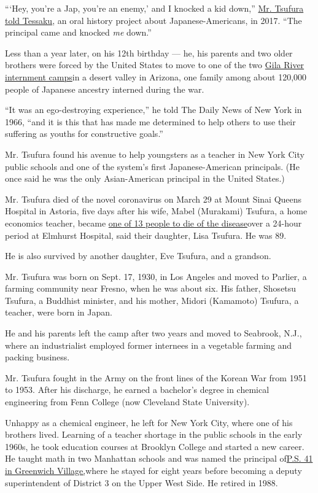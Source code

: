 ```Hey, you're a Jap, you're an enemy,' and I knocked a kid down,''
\href{https://www.tessaku.com/oral-histories//2017/03/15/tadashi-tsufura}{Mr.
Tsufura told Tessaku}, an oral history project about Japanese-Americans,
in 2017. ``The principal came and knocked \emph{me} down.''

Less than a year later, on his 12th birthday --- he, his parents and two
older brothers were forced by the United States to move to one of the
two \href{https://encyclopedia.densho.org/Gila_River/}{Gila River
internment camps}in a desert valley in Arizona, one family among about
120,000 people of Japanese ancestry interned during the war.

``It was an ego-destroying experience,'' he told The Daily News of New
York in 1966, ``and it is this that has made me determined to help
others to use their suffering as youths for constructive goals.''

Mr. Tsufura found his avenue to help youngsters as a teacher in New York
City public schools and one of the system's first Japanese-American
principals. (He once said he was the only Asian-American principal in
the United States.)

Mr. Tsufura died of the novel coronavirus on March 29 at Mount Sinai
Queens Hospital in Astoria, five days after his wife, Mabel (Murakami)
Tsufura, a home economics teacher, became
\href{https://www.nytimes3xbfgragh.onion/2020/03/25/nyregion/nyc-coronavirus-hospitals.html}{one
of 13 people to die of the disease}over a 24-hour period at Elmhurst
Hospital, said their daughter, Lisa Tsufura. He was 89.

He is also survived by another daughter, Eve Tsufura, and a grandson.

Mr. Tsufura was born on Sept. 17, 1930, in Los Angeles and moved to
Parlier, a farming community near Fresno, when he was about six. His
father, Shosetsu Tsufura, a Buddhist minister, and his mother, Midori
(Kamamoto) Tsufura, a teacher, were born in Japan.

He and his parents left the camp after two years and moved to Seabrook,
N.J., where an industrialist employed former internees in a vegetable
farming and packing business.

Mr. Tsufura fought in the Army on the front lines of the Korean War from
1951 to 1953. After his discharge, he earned a bachelor's degree in
chemical engineering from Fenn College (now Cleveland State University).

Unhappy as a chemical engineer, he left for New York City, where one of
his brothers lived. Learning of a teacher shortage in the public schools
in the early 1960s, he took education courses at Brooklyn College and
started a new career. He taught math in two Manhattan schools and was
named the principal of\href{https://www.ps41.org/}{P.S. 41 in Greenwich
Village,}where he stayed for eight years before becoming a deputy
superintendent of District 3 on the Upper West Side. He retired in 1988.

